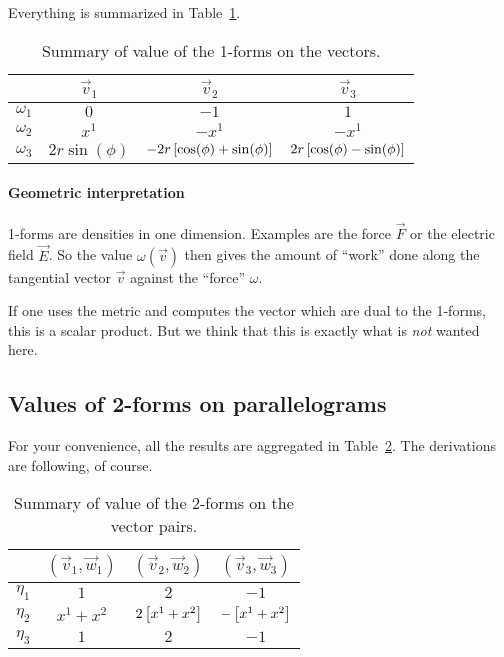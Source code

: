 \documentclass[11pt, english, fleqn, DIV=15, headinclude, BCOR=1cm]{scrartcl}
\begin{document}
Everything is summarized in Table~\ref{tab:values}.

\begin{table}[htbp]
    \centering
    \begin{tabular}{c|ccc}
        & $\vec v_1$ & $\vec v_2$ & $\vec v_3$ \\
        \midrule
        $\omega_1$ & $0$ & $-1$ & $1$ \\
        $\omega_2$ & $x^1$ & $- x^1$ & $- x^1$ \\
        $\omega_3$ & $2 r \sin(\phi)$ & $- 2 r
        \left[ \cos(\phi) + \sin(\phi) \right]$ & $2 r
        \left[ \cos(\phi) - \sin(\phi) \right]$ \\
    \end{tabular}
    \caption{%
        Summary of value of the 1-forms on the vectors.
    }
    \label{tab:values}
\end{table}

\paragraph{Geometric interpretation}

1-forms are densities in one dimension. Examples are the force $\vec F$ or the
electric field $\vec E$. So the value $\omega(\vec v)$ then gives the amount of
“work” done along the tangential vector $\vec v$ against the “force” $\omega$.

If one uses the metric and computes the vector which are dual to the 1-forms,
this is a scalar product. But we think that this is exactly what is \emph{not}
wanted here.

\subsection{Values of 2-forms on parallelograms}

For your convenience, all the results are aggregated in
Table~\ref{tab:values2}. The derivations are following, of course.

\begin{table}[htbp]
    \centering
    \begin{tabular}{c|ccc}
        & $(\vec v_1, \vec w_1)$ & $(\vec v_2, \vec w_2)$ & $(\vec v_3, \vec w_3)$ \\
        \midrule
        $\eta_1$ & $1$ & $2$ & $-1$ \\
        $\eta_2$ & $x^1+x^2$ & $2\left[ x^1+x^2 \right]$ & $-\left[ x^1+x^2 \right]$ \\
        $\eta_3$ & $1$ & $2$ & $-1$
    \end{tabular}
    \caption{%
        Summary of value of the 2-forms on the vector pairs.
    }
    \label{tab:values2}
\end{table}
\end{document}
